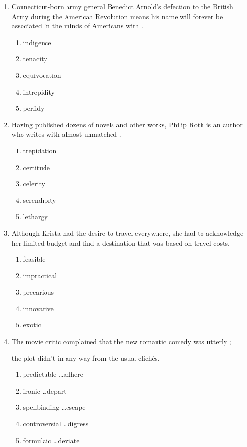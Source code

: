 \documentclass[12pt]{book}
\newcommand{\longline}{\underline{\hspace{2in}} }
\begin{document}
\begin{enumerate}
\bigskip
\item Connecticut-born army general Benedict Arnold's defection to the British Army during the American Revolution means his name will forever be associated in the minds of Americans with \longline.
\begin{enumerate}[label=(\Alph*)]
\item indigence
\item tenacity
\item equivocation
\item intrepidity
\item perfidy
\end{enumerate}

\bigskip
\item Having published dozens of novels and other works, Philip Roth is an author who writes with almost unmatched \longline.
\begin{enumerate}[label=(\Alph*)]
\item trepidation
\item certitude
\item celerity
\item serendipity
\item lethargy
\end{enumerate}

\bigskip
\item Although Krista had the desire to travel everywhere, she had to acknowledge her limited budget and find a destination that was \longline based on travel costs.
\begin{enumerate}[label=(\Alph*)]
\item feasible
\item impractical
\item precarious
\item innovative
\item exotic
\end{enumerate}

\bigskip
\item The movie critic complained that the new romantic comedy was utterly \hrulefill;

the plot didn't \longline  in any way from the usual clich\'es. 

\begin{enumerate}[label=(\Alph*)]
\item predictable \ldots adhere
\item ironic \ldots depart
\item spellbinding \ldots escape
\item controversial \ldots digress
\item formulaic \ldots deviate 
\end{enumerate}


\end{enumerate}
\end{document}
